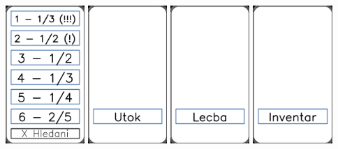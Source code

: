 \documentclass[a4paper]{article}
\begin{document}
	\includegraphics[width=3.0cm]{img-5_11}
	\includegraphics[width=3.0cm]{img-6_0}
	\includegraphics[width=3.0cm]{img-6_1}
	\includegraphics[width=3.0cm]{img-6_2}
\end{document}
